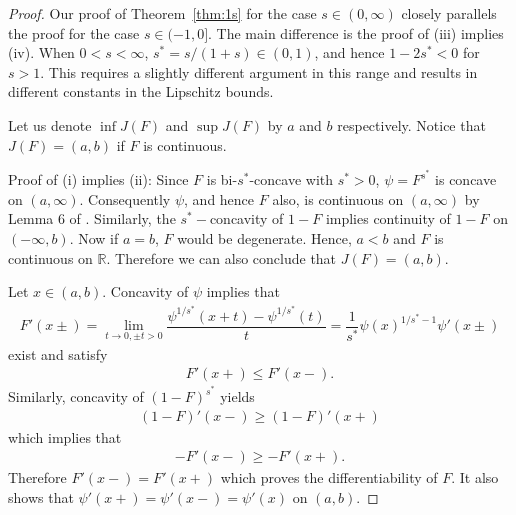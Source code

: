\documentclass[11pt]{amsart}
\numberwithin{equation}{section}
\newcommand{\RR}{\mathbb{R}}
\def\st{\ensuremath{s^*}}
\theoremstyle{definition}\newtheorem{definition}{Definition}
\theoremstyle{remark}\newtheorem{assumption}{Assumption}
\theoremstyle{remark}\newtheorem{remark}{Remark}
\theoremstyle{definition}\newtheorem{example}{Example}
\theoremstyle{plain}\newtheorem{question}{Question}
\theoremstyle{plain}\newtheorem{theorem}{Theorem}
\theoremstyle{plain}\newtheorem{lemma}{Lemma}
\theoremstyle{plain}\newtheorem{proposition}{Proposition}
\theoremstyle{plain}\newtheorem{corollary}{Corollary}
\theoremstyle{plain}\newtheorem{conjecture}{Conjecture}
\begin{document}
\begin{proof} 
 Our proof of Theorem~\ref{thm:1s} for the case $s \in (0,\infty)$ closely parallels the proof 
for the case $s\in(-1,0]$.  The main difference is the proof of (iii) implies (iv).  
When $0 < s < \infty$, $s^* = s/(1+s) \in (0,1)$, and hence $1-2s^* < 0$ for $s>1$.  
This requires a slightly different argument in this range and results in different constants 
in the Lipschitz bounds. 

 Let us denote $\inf J(F)$ and $\sup J(F)$ by $a$ and $b$ respectively. Notice that $J(F)=(a,b)$ if $F$ is continuous.  

Proof of (i) implies (ii): 
Since $F$ is bi-$s^*$-concave with $\st>0$, $\psi=F^{\st}$ is concave on $(a,\infty)$. Consequently %
$\psi$, and hence $F$ also, is continuous on $(a,\infty)$ by  Lemma $6$ of \cite{DuembgenKW:2017}. 
  Similarly, the $s^*-$concavity of $1-F$ 
  implies continuity of $1-F$ on $(-\infty,b).$
 Now if $a=b$, $F$ would be degenerate. Hence, $a<b$ and $F$ is continuous on $\RR$. 
  Therefore we can also conclude that $J(F)=(a,b)$.  
  
Let $x\in(a,b)$. Concavity of $\psi$ implies that 
\begin{eqnarray*}
  F'(x\pm)=\lim_{t\to 0,\pm t>0}\dfrac{\psi^{1/s^*}(x+t)-\psi^{1/s^*}(t)}{t}=\dfrac{1}{s^*}\psi(x)^{1/s^*-1}\psi'(x\pm)
\end{eqnarray*}
  exist and satisfy
\begin{eqnarray*}
  F'(x+) \le F'(x-) .
\end{eqnarray*} 
Similarly, concavity of $(1-F)^{s^*}$ yields %
\begin{eqnarray*}
  (1-F)'(x-)\geq (1-F)'(x+)
\end{eqnarray*} 
  which implies that
\begin{eqnarray*}
  -F'(x-)\geq -F'(x+).
\end{eqnarray*}
Therefore $F'(x-)=F'(x+)$ which proves the differentiability of $F$. 
It also shows that $\psi'(x+)=\psi'(x-)=\psi'(x)$ on $(a,b)$.
 

\end{proof}
\end{document}
